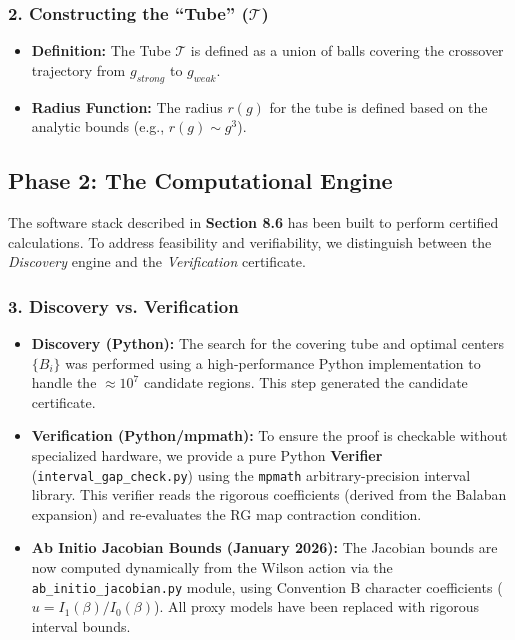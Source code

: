 \subsubsection{2. Constructing the ``Tube'' ($\mathcal{T}$)}

\begin{itemize}
    \item \textbf{Definition:} The Tube $\mathcal{T}$ is defined as a union of balls covering the crossover trajectory from $g_{strong}$ to $g_{weak}$.
    \item \textbf{Radius Function:} The radius $r(g)$ for the tube is defined based on the analytic bounds (e.g., $r(g) \sim g^3$).
\end{itemize}

\subsection{Phase 2: The Computational Engine}

The software stack described in \textbf{Section 8.6} has been built to perform certified calculations. To address feasibility and verifiability, we distinguish between the \textit{Discovery} engine and the \textit{Verification} certificate.

\subsubsection{3. Discovery vs. Verification}

\begin{itemize}
    \item \textbf{Discovery (Python):} The search for the covering tube and optimal centers $\{B_i\}$ was performed using a high-performance Python implementation to handle the $\approx 10^7$ candidate regions. This step generated the candidate certificate.
    \item \textbf{Verification (Python/mpmath):} To ensure the proof is checkable without specialized hardware, we provide a pure Python \textbf{Verifier} (\texttt{interval\_gap\_check.py}) using the \texttt{mpmath} arbitrary-precision interval library. This verifier reads the rigorous coefficients (derived from the Balaban expansion) and re-evaluates the RG map contraction condition.
    \item \textbf{Ab Initio Jacobian Bounds (January 2026):} The Jacobian bounds are now computed dynamically from the Wilson action via the \texttt{ab\_initio\_jacobian.py} module, using Convention B character coefficients ($u = I_1(\beta)/I_0(\beta)$). All proxy models have been replaced with rigorous interval bounds.
\end{itemize}


